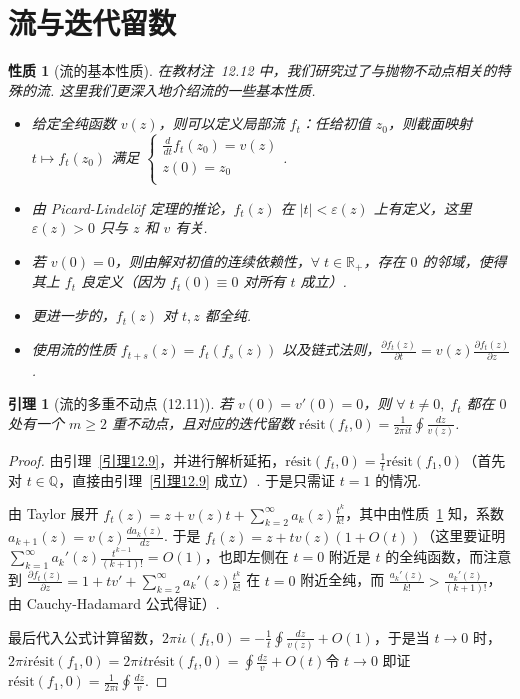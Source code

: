 \documentclass[11pt, a4paper, oneside]{ctexart}
\newtheorem{lemma}[theorem]{引理}
\newtheorem{property}[theorem]{性质}
\newcommand{\Q}{\mathbb{Q}}
\newcommand{\R}{\mathbb{R}}
\newcommand{\ri}{\mathrm{résit}}
\newcommand{\abs}[1]{\left|{#1}\right|}
\newcommand{\partials}[2]{\frac{\partial{#1}}{\partial{#2}}}
\begin{document}
    \section{流与迭代留数}

    \begin{property}[流的基本性质]\label{性质2.25}
        在教材注~12.12 中，我们研究过了与抛物不动点相关的特殊的流. 这里我们更深入地介绍流的一些基本性质.
        \begin{itemize}
            \item 给定全纯函数 $v(z)$，则可以定义局部流 $f_t$：任给初值 $z_0$，则截面映射 $t\mapsto f_t(z_0)$ 满足 $\begin{cases}
                \frac{d}{dt}f_t(z_0)=v(z)\\
                z(0)=z_0\\
            \end{cases}$.
            \item 由 Picard-Lindelöf 定理的推论，$f_t(z)$ 在 $\abs{t}<\varepsilon(z)$ 上有定义，这里 $\varepsilon(z)>0$ 只与 $z$ 和 $v$ 有关.
            \item 若 $v(0)=0$，则由解对初值的连续依赖性，$\forall\; t\in\R_+$，存在 $0$ 的邻域，使得其上 $f_t$ 良定义（因为 $f_t(0)\equiv 0$ 对所有 $t$ 成立）.
            \item 更进一步的，$f_t(z)$ 对 $t,z$ 都全纯.
            \item 使用流的性质 $f_{t+s}(z)=f_t(f_s(z))$ 以及链式法则，$\partials{f_t(z)}{t}=v(z)\partials{f_t(z)}{z}$.
        \end{itemize}
    \end{property}

    \begin{lemma}[流的多重不动点 (12.11)]
        若 $v(0)=v'(0)=0$，则 $\forall\; t\neq 0,\; f_t$ 都在 $0$ 处有一个 $m\geq 2$ 重不动点，且对应的迭代留数 $\ri(f_t,0)=\frac{1}{2\pi i t}\oint\frac{dz}{v(z)}$.
    \end{lemma}
    \begin{proof}
        由引理~\ref{引理12.9}，并进行解析延拓，$\ri(f_t,0)=\frac{1}{t}\ri(f_1,0)$（首先对 $t\in\Q$，直接由引理~\ref{引理12.9} 成立）. 于是只需证 $t=1$ 的情况.

        由 Taylor 展开 $f_t(z)=z+v(z)t+\sum\limits_{k=2}^{\infty}a_k(z)\frac{t^k}{k!}$，其中由性质~\ref{性质2.25} 知，系数 $a_{k+1}(z)=v(z)\frac{da_k(z)}{dz}$. 于是 $f_t(z)=z+tv(z)(1+O(t))$（这里要证明 $\sum\limits_{k=1}^{\infty}a_k'(z)\frac{t^{k-1}}{(k+1)!}=O(1)$，也即左侧在 $t=0$ 附近是 $t$ 的全纯函数，而注意到 $\partials{f_t(z)}{z}=1+tv'+\sum\limits_{k=2}^{\infty}a_k'(z)\frac{t^k}{k!}$ 在 $t=0$ 附近全纯，而 $\frac{a_k'(z)}{k!}>\frac{a_k'(z)}{(k+1)!}$，由 Cauchy-Hadamard 公式得证）.

        最后代入公式计算留数，$2\pi i\iota(f_t,0)=-\frac{1}{t}\oint\frac{dz}{v(z)}+O(1)$，于是当 $t\to 0$ 时，$2\pi i\ri(f_1,0)=2\pi it\ri(f_t,0)=\oint\frac{dz}{v}+O(t)$令 $t\to 0$ 即证 $\ri(f_1,0)=\frac{1}{2\pi i}\oint\frac{dz}{v}$.
    \end{proof}
\end{document}
